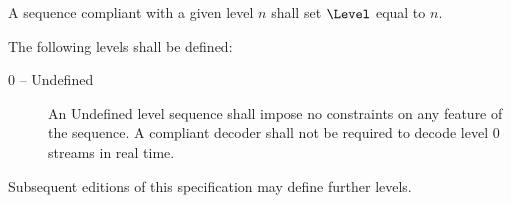 A sequence compliant with a given level $n$ shall set $\Level$ equal to $n$.

The following levels shall be defined:
\begin{description}
\item[0 -- Undefined] An Undefined level sequence shall impose no constraints on
any feature of the sequence. A compliant decoder shall not be required to decode level 0
streams in real time.
\end{description}

Subsequent editions of this specification may define further levels.

\begin{comment}
\subsection{Decoded picture buffer model operation}
\label{decodedbufferop}

In order to define compliance with level and profile requirements, a model of decoded picture buffer
operation is specified.

The decoded picture buffer (DPB) $\DecodedBuffer$ exists to allow for pictures to be presented in display, or 
picture number, order whilst pictures are coded out of order. No constraints are placed on the order
of pictures within a Dirac stream provided that reordering can be carried out within the given size of
the DPB. The DPB size is the minimum delay required by the decoder, ignoring decoding time and stream
buffering delays (Section \ref{streambufferop}).

Note that the DPB is distinct from the reference picture buffer, and the removal of pictures from,
or placement in, the DPB is wholly independent in this specification, although in practice shared
storage may be employed.

Pictures are deemed to be output from the decoder and placed in the DPB instantaneously at multiples
of the (real number) picture sample interval $\PictureInterval$. This interval is defined as follows:
\begin{itemize}
\item otherwise (i.e. pictures are frames) then 
\begin{equation*}
\PictureInterval=\dfrac{\SFrameRateDenom}{\SFrameRateNumer}
\end{equation*}
\end{itemize}


\end{comment}
